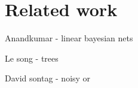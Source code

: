 \section{Related work}

Anandkumar - linear bayesian nets

Le song - trees

David sontag - noisy or


